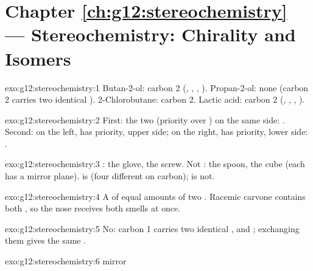\section*{Chapter \ref{ch:g12:stereochemistry} --- Stereochemistry: Chirality and Isomers}

\begin{solution}{exo:g12:stereochemistry:1}
Butan-2-ol: carbon 2 (, , , ).
Propan-2-ol: none (carbon 2 carries two identical ).
2-Chlorobutane: carbon 2. Lactic acid: carbon 2 (, ,
, ).
\end{solution}

\begin{solution}{exo:g12:stereochemistry:2}
First: the two  (priority over ) on the same side: .
Second: on the left,  has priority, upper side; on the right,
 has priority, lower side: .
\end{solution}

\begin{solution}{exo:g12:stereochemistry:3}
: the glove, the screw. Not : the spoon, the cube (each has
a mirror plane).  is  (four different  on carbon);
 is not.
\end{solution}

\begin{solution}{exo:g12:stereochemistry:4}
A  of equal amounts of two . Racemic carvone contains
both , so the nose receives both smells at once.
\end{solution}

\begin{solution}{exo:g12:stereochemistry:5}
No: carbon 1 carries two identical ,  and ; exchanging
them gives the same .
\end{solution}

\begin{solution}{exo:g12:stereochemistry:6}
 \quad mirror
\quad {}
\end{solution}

